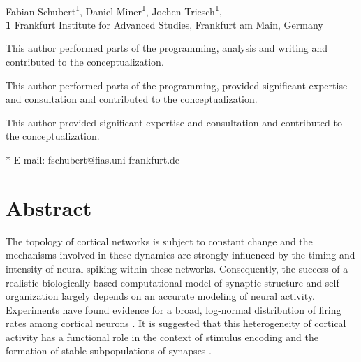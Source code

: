 \documentclass[10pt,letterpaper]{article}
\date{}
\begin{document}
\vspace*{0.2in}

\begin{flushleft}
{\Large
\textbf{} %
}
\newline
\\
Fabian Schubert\textsuperscript{1\Yinyang},
Daniel Miner\textsuperscript{1\ddag},
Jochen Triesch\textsuperscript{1\dag},
\\
\bigskip
\textbf{1} Frankfurt Institute for Advanced Studies, Frankfurt am Main, Germany
\\
\bigskip

% 
%
\Yinyang This author performed parts of the programming, analysis and writing and contributed to the conceptualization.

\ddag This author performed parts of the programming, provided significant expertise and consultation and contributed to the conceptualization.

\dag This author provided significant expertise and consultation and contributed to the conceptualization.

* E-mail: fschubert@fias.uni-frankfurt.de

\end{flushleft}
\section*{Abstract}
The topology of cortical networks is subject to constant change and the mechanisms involved in these dynamics are strongly influenced by the timing and intensity of neural spiking within these networks. Consequently, the success of a realistic biologically based computational model of synaptic structure and self-organization largely depends on an accurate modeling of neural activity. Experiments have found evidence for a broad, log-normal distribution of firing rates among cortical neurons \cite{Buzsaki_Fir_Rates_2014,Wohrer_Fir_Rates_2012}.
It is suggested that this heterogeneity of cortical activity has a functional role in the context of stimulus encoding and the formation of stable subpopulations of synapses \cite{Marsat_2010,Dragoi_2003,Buzsaki_2004,Buzsaki_Fir_Rates_2014}.
\end{document}
